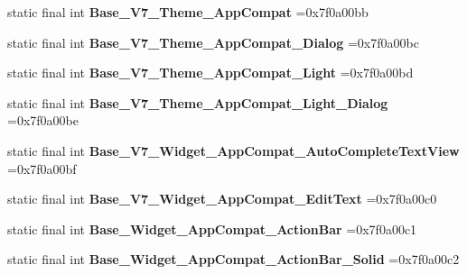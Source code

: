 \begin{DoxyCompactItemize}
\item 
\mbox{\label{classproject4_1_1xaria_1_1R_1_1style_a77ec7d40fcd62e89ddbbe434e508a378}} 
static final int {\bfseries Base\+\_\+\+V7\+\_\+\+Theme\+\_\+\+App\+Compat} =0x7f0a00bb
\item 
\mbox{\label{classproject4_1_1xaria_1_1R_1_1style_a8838d5a84cc28200149340ba420cb82b}} 
static final int {\bfseries Base\+\_\+\+V7\+\_\+\+Theme\+\_\+\+App\+Compat\+\_\+\+Dialog} =0x7f0a00bc
\item 
\mbox{\label{classproject4_1_1xaria_1_1R_1_1style_a989b08dae98d4d26a0c18388f936446b}} 
static final int {\bfseries Base\+\_\+\+V7\+\_\+\+Theme\+\_\+\+App\+Compat\+\_\+\+Light} =0x7f0a00bd
\item 
\mbox{\label{classproject4_1_1xaria_1_1R_1_1style_a16c713bf55087fc08ec5e77dc79b0889}} 
static final int {\bfseries Base\+\_\+\+V7\+\_\+\+Theme\+\_\+\+App\+Compat\+\_\+\+Light\+\_\+\+Dialog} =0x7f0a00be
\item 
\mbox{\label{classproject4_1_1xaria_1_1R_1_1style_a2fde7593d192ad6a4d81145a0325e785}} 
static final int {\bfseries Base\+\_\+\+V7\+\_\+\+Widget\+\_\+\+App\+Compat\+\_\+\+Auto\+Complete\+Text\+View} =0x7f0a00bf
\item 
\mbox{\label{classproject4_1_1xaria_1_1R_1_1style_a87c38a9050713a673b8b4e39e9078210}} 
static final int {\bfseries Base\+\_\+\+V7\+\_\+\+Widget\+\_\+\+App\+Compat\+\_\+\+Edit\+Text} =0x7f0a00c0
\item 
\mbox{\label{classproject4_1_1xaria_1_1R_1_1style_a42ce14c9062836f77f1ae6b86996cb9c}} 
static final int {\bfseries Base\+\_\+\+Widget\+\_\+\+App\+Compat\+\_\+\+Action\+Bar} =0x7f0a00c1
\item 
\mbox{\label{classproject4_1_1xaria_1_1R_1_1style_a7251bf1a16c49c0f2c4b7c5b5bf8abff}} 
static final int {\bfseries Base\+\_\+\+Widget\+\_\+\+App\+Compat\+\_\+\+Action\+Bar\+\_\+\+Solid} =0x7f0a00c2
\item 

\end{DoxyCompactItemize}
